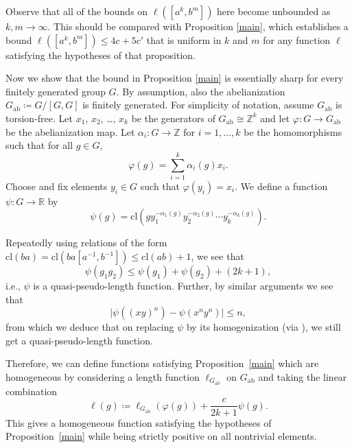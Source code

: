 \documentclass[11pt,a4paper,reqno]{amsart}
\numberwithin{equation}{section}
\theoremstyle{plain}
\theoremstyle{definition}
\newcommand\Z{\mathbb{Z}}
\newcommand\normsymb{\ell}  %
\newcommand\norm[1]{\ell({#1})}   %
\begin{document}
Observe that all of the bounds on $\norm{[a^k, b^m]}$ here become
unbounded as $k,m \to \infty$.  This should be compared with Proposition
\ref{main}, which establishes a bound $\norm{[a^k,b^m]} \leq 4c+5c'$ that
is uniform in $k$ and $m$ for any function $\normsymb$ satisfying the
hypotheses of that proposition.

Now we show that the bound in Proposition \ref{main} is essentially sharp
for every finitely generated group $G$.
By assumption, also the abelianization $G_{\mathrm{ab}} \coloneqq
G/[G,G]$ is finitely generated. For simplicity of notation, assume
$G_{\mathrm{ab}}$ is torsion-free. Let $x_1$, $x_2$, \dots, $x_k$ be the
generators of $G_{\mathrm{ab}} \cong \Z^k$ and let $\varphi: G \to
G_{\mathrm{ab}}$ be the abelianization map. Let $\alpha_i : G \to \Z$ for
$i = 1,\ldots, k$ be the homomorphisms such that for all $g\in G$,
\[
\varphi(g) = \sum_{i=1}^k \alpha_i(g)x_i.
\]
Choose and fix elements $y_i\in G$ such that $\varphi(y_i) = x_i$. We
define a function $\psi: G \to \mathbb{R}$ by
\[
\psi(g) = \mathrm{cl}(g y_1^{-\alpha_1(g)}y_2^{-\alpha_2(g)}\cdots
y_k^{-\alpha_k(g)}).
\]

Repeatedly using relations of the form $\mathrm{cl}(ba) =
\mathrm{cl}(ba[a^{-1}, b^{-1}]) \leq \mathrm{cl}(ab) + 1$, we see that
\[
\psi(g_1g_2)\leq \psi(g_1) + \psi(g_2) + (2k + 1),
\]
i.e., $\psi$ is a quasi-pseudo-length function. Further, by similar
arguments we see that
\[
\vert\psi((xy)^n) - \psi(x^ny^n)\vert \leq n,
\]
from which we deduce that on replacing $\psi$ by its homogenization
(via \cite[Theorem 23]{BE}), we still get a quasi-pseudo-length function.

Therefore, we can define functions satisfying Proposition~\ref{main}
which are homogeneous by considering a length function
$\normsymb_{G_{\mathrm{ab}} }$ on $G_{\mathrm{ab}}$ and taking the linear
combination
\[
\norm{g} \coloneqq \normsymb_{G_{\mathrm{ab}} }(\varphi(g)) +
\frac{c}{2k+1} \psi(g).
\]
This gives a homogeneous function satisfying the hypotheses of
Proposition~\ref{main} while being strictly positive on all nontrivial
elements.
\end{document}
